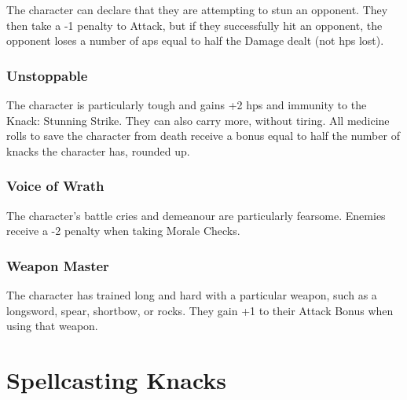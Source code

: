 \begin{multicols}{2}
The character can declare that they are attempting to stun an opponent.
They then take a -1 penalty to Attack, but if they successfully hit an opponent, the opponent loses a number of \glspl{ap} equal to half the Damage dealt (not \glspl{hp} lost).

\subsubsection{Unstoppable}

The character is particularly tough and gains +2 \glspl{hp} and immunity to the Knack: Stunning Strike.
They can also carry more, without tiring.%
All medicine rolls to save the character from death receive a bonus equal to half the number of knacks the character has, rounded up.

\subsubsection{Voice of Wrath}

The character's battle cries and demeanour are particularly fearsome.
Enemies receive a -2 penalty when taking Morale Checks.

\subsubsection{Weapon Master}

The character has trained long and hard with a particular weapon, such as a longsword, spear, shortbow, or rocks.
They gain +1 to their Attack Bonus when using that weapon.

\end{multicols}

\section{Spellcasting Knacks}

